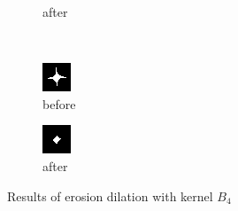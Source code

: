 \documentclass[12pt]{article}
\renewcommand{\subfiguresize}{.25\textwidth}
\begin{document}
\begin{figure}[H]
\begin{subfigure}[t]{\subfiguresize}
        \caption{after}
    \end{subfigure}\\[1em]
    \begin{subfigure}[t]{\subfiguresize}\centering
        \includegraphics[width=\textwidth]{img/image2.png}
        \caption{before}
    \end{subfigure}
    \hspace{2em}
    \begin{subfigure}[t]{\subfiguresize}\centering
        \includegraphics[width=\textwidth]{img/image2-erosion-4adj.png}
        \caption{after}
    \end{subfigure}
    \caption{Results of erosion dilation with kernel $B_4$}
\end{figure} 
\end{document}
